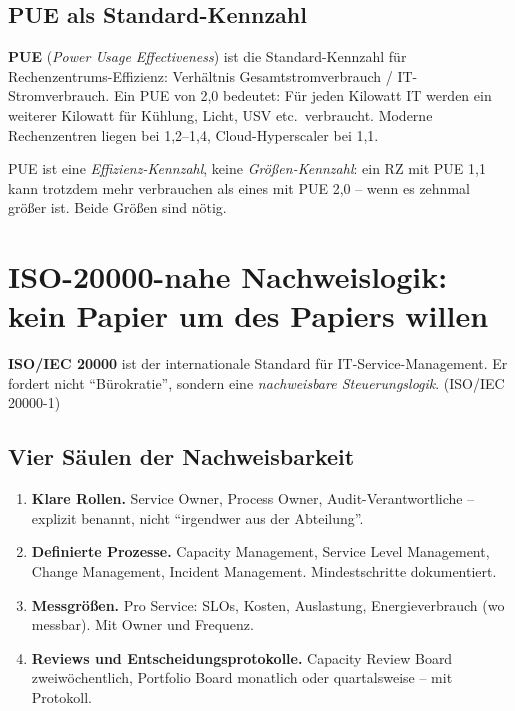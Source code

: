 \documentclass[11pt,a4paper,oneside]{article}
\newcommand{\fachbegriff}[1]{\textbf{#1}}
\newcommand{\quelle}[1]{{\footnotesize\color{lpGray}(#1)}}
\begin{document}
\subsection{PUE als Standard-Kennzahl}

\fachbegriff{PUE} (\emph{Power Usage Effectiveness}) ist die Standard-Kennzahl für Rechenzentrums-Effizienz: Verhältnis Gesamtstromverbrauch / IT-Stromverbrauch. Ein PUE von 2,0 bedeutet: Für jeden Kilowatt IT werden ein weiterer Kilowatt für Kühlung, Licht, USV etc.\ verbraucht. Moderne Rechenzentren liegen bei 1,2--1,4, Cloud-Hyperscaler bei 1,1.

PUE ist eine \emph{Effizienz-Kennzahl}, keine \emph{Größen-Kennzahl}: ein RZ mit PUE 1,1 kann trotzdem mehr verbrauchen als eines mit PUE 2,0 -- wenn es zehnmal größer ist. Beide Größen sind nötig.

\section{ISO-20000-nahe Nachweislogik: kein Papier um des Papiers willen}

\fachbegriff{ISO/IEC 20000} ist der internationale Standard für IT-Service-Management. Er fordert nicht ``Bürokratie'', sondern eine \emph{nachweisbare Steuerungslogik}. \quelle{ISO/IEC 20000-1}

\subsection{Vier Säulen der Nachweisbarkeit}

\begin{enumerate}
  \item \fachbegriff{Klare Rollen.} Service Owner, Process Owner, Audit-Verantwortliche -- explizit benannt, nicht ``irgendwer aus der Abteilung''.
  \item \fachbegriff{Definierte Prozesse.} Capacity Management, Service Level Management, Change Management, Incident Management. Mindestschritte dokumentiert.
  \item \fachbegriff{Messgrößen.} Pro Service: SLOs, Kosten, Auslastung, Energieverbrauch (wo messbar). Mit Owner und Frequenz.
  \item \fachbegriff{Reviews und Entscheidungsprotokolle.} Capacity Review Board zweiwöchentlich, Portfolio Board monatlich oder quartalsweise -- mit Protokoll.
\end{enumerate}
\end{document}
